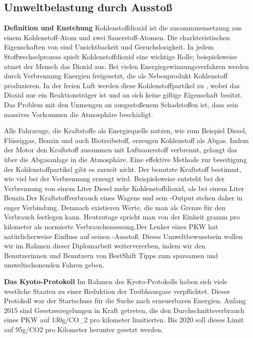 \subsection{Umweltbelastung durch  Ausstoß}

\textbf{Definition und Enstehung\nextline}
Kohlenstoffdioxid ist die zusammmensetzung aus einem Kohlenstoff-Atom und zwei Sauerstoff-Atomen. Die charkteristischen Eigenschaften von  sind Unsichtbarkeit und Geruchslosigkeit. In jedem Stoffwechselprozess spielt Kohlenstoffdioxid eine wichtige Rolle; beispielsweise atmet der Mensch das Dioxid aus. Bei vielen Energiegewinnungsverfahren werden durch Verbrennung Energien freigesetzt, die als Nebenprodukt Kohlenstoff produzieren. In der freien Luft werden diese Kohlenstoffpartikel zu , wobei das Dioxid nur ein Reaktionsträger ist und an sich keine giftige Eigenschaft besitzt. Das Problem mit den Unmengen an ausgestoßenem Schadstoffen ist, dass sein massives Vorkommen die Atmosphäre beschädigt.

Alle Fahrzeuge, die Kraftstoffe als Energiequelle nutzen, wie zum Beispiel Diesel, Flüssiggas, Benzin und auch Biotreibstoff, erzeugen Kohlenstoff als Abgas. Indem der Motor den Kraftstoff zusammen mit Luftsauerstoff verbrennt, gelangt das  über die Abgasanlage in die Atmosphäre. Eine effektive Methode zur beseitigung der Kohlenstoffpartikel gibt es zurzeit nicht. Der benutzte Kraftstoff bestimmt, wie viel  bei der Verbrennung erzeugt wird. Beispielsweise entsteht bei der Verbrennung von einem Liter Diesel mehr Kohlenstoffdioxid, als bei einem Liter Benzin.Der Kraftstoffverbrauch eines Wagens und sein -Output stehen daher in enger Verbindung. Demnach existieren Werte, die man als Grenze für den Verbrauch festlegen kann. Heutzutage spricht man von der Einheit gramm pro kilometer als normierte Verbrauchsmessung.Der Lenker eines PKW hat natürlicherweise Einfluss auf seinen -Ausstoß. Dieses Umweltbewusstsein wollen wir im Rahmen dieser Diplomarbeit weitervererben, indem wir den Benutzerinnen und Benutzern von BestShift Tipps zum sparsamen und umweltschonenden Fahren geben.

\textbf{Das Kyoto-Protokoll\nextline}
Im Rahmen des Kyoto-Protokolls haben sich viele westliche Staaten zu einer Reduktion der Treibhausgase verpflichtet. 
Dieses Protokoll war der Startschuss für die Suche nach erneuerbaren Energien. 
Anfang 2015 sind Gesetzesregelungen in Kraft getreten, die den Durchschnittsverbrauch eines PKW auf 130g/CO_{2} pro kilometer limitierten. 
Bis 2020 soll dieses Limit auf 95g/CO2 pro Kilometer herunter gesetzt werden.



\clearpage %
